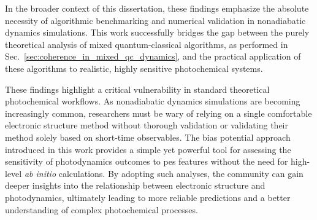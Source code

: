 In the broader context of this dissertation, these findings emphasize the absolute necessity of algorithmic benchmarking and numerical validation in nonadiabatic dynamics simulations. This work successfully bridges the gap between the purely theoretical analysis of mixed quantum-classical algorithms, as performed in Sec.~\ref{sec:coherence_in_mixed_qc_dynamics}, and the practical application of these algorithms to realistic, highly sensitive photochemical systems.

These findings highlight a critical vulnerability in standard theoretical photochemical workflows. As nonadiabatic dynamics simulations are becoming increasingly common, researchers must be wary of relying on a single comfortable electronic structure method without thorough validation or validating their method solely based on short-time observables. The bias potential approach introduced in this work provides a simple yet powerful tool for assessing the sensitivity of photodynamics outcomes to \gls{pes} features without the need for high-level \textit{ab initio} calculations. By adopting such analyses, the community can gain deeper insights into the relationship between electronic structure and photodynamics, ultimately leading to more reliable predictions and a better understanding of complex photochemical processes.
